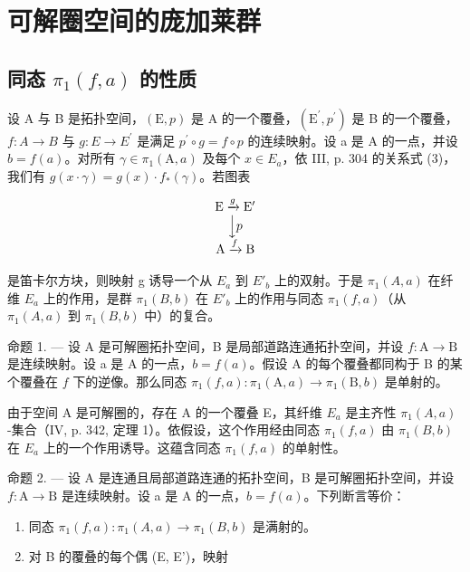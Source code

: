 \section{可解圈空间的庞加莱群}

\subsection{\texorpdfstring{同态 \(\pi_{1}(f,a)\) 的性质}{同态 pi\_1(f,a) 的性质}}

设 A 与 B 是拓扑空间，\((\mathrm{E},p)\) 是 A 的一个覆叠，\((\mathrm{E}^{\prime},p^{\prime})\) 是 B 的一个覆叠，\(f\colon A\to B\) 与 \(g\colon E\to E^{\prime}\) 是满足 \(p^{\prime}\circ g=f\circ p\) 的连续映射。设 a 是 A 的一点，并设 \(b=f(a)\)。对所有 \(\gamma\in\pi_{1}(\mathrm{A},a)\) 及每个 \(x\in E_{a}\)，依 III, p. 304 的关系式 (3)，我们有 \(g(x\cdot\gamma)=g(x)\cdot f_{*}(\gamma)\)。若图表

\[
\begin{array}{c} \mathrm{E} \xrightarrow {g} \mathrm{E} ^ {\prime} \\ \Big \downarrow p \\ \mathrm{A} \xrightarrow {f} \mathrm{B} \end{array}
\]

是笛卡尔方块，则映射 g 诱导一个从 \(E_{a}\) 到 \(E'_{b}\) 上的双射。于是 \(\pi_{1}(A,a)\) 在纤维 \(E_{a}\) 上的作用，是群 \(\pi_{1}(B,b)\) 在 \(E'_{b}\) 上的作用与同态 \(\pi_{1}(f,a)\)（从 \(\pi_{1}(A,a)\) 到 \(\pi_{1}(B,b)\) 中）的复合。

命题 1. --- 设 A 是可解圈拓扑空间，B 是局部道路连通拓扑空间，并设 \(f\colon\mathrm{A}\to\mathrm{B}\) 是连续映射。设 a 是 A 的一点，\(b=f(a)\)。假设 A 的每个覆叠都同构于 B 的某个覆叠在 \(f\) 下的逆像。那么同态 \(\pi_{1}(f,a)\colon\pi_{1}(\mathrm{A},a)\to\pi_{1}(\mathrm{B},b)\) 是单射的。

由于空间 A 是可解圈的，存在 A 的一个覆叠 E，其纤维 \(E_{a}\) 是主齐性 \(\pi_{1}(A,a)\) -集合（IV, p. 342, 定理 1）。依假设，这个作用经由同态 \(\pi_{1}(f,a)\) 由 \(\pi_{1}(B,b)\) 在 \(E_{a}\) 上的一个作用诱导。这蕴含同态 \(\pi_{1}(f,a)\) 的单射性。

命题 2. --- 设 A 是连通且局部道路连通的拓扑空间，B 是可解圈拓扑空间，并设 \(f\colon\mathrm{A}\to\mathrm{B}\) 是连续映射。设 a 是 A 的一点，\(b=f(a)\)。下列断言等价：

\begin{enumerate}
\def\labelenumi{(\roman{enumi})}
\item
  同态 \(\pi_1(f,a)\colon \pi_1(A,a)\to \pi_1(B,b)\) 是满射的。
\item
  对 B 的覆叠的每个偶 (E, E')，映射
\end{enumerate}


